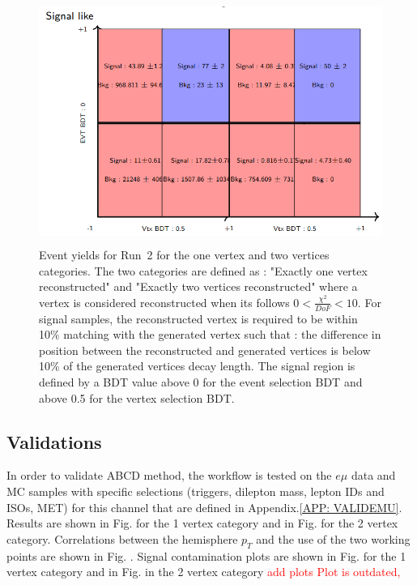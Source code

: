 \documentclass{cernatlasnote}
\begin{document}
        \begin{figure}[ht]
\centering
\includegraphics[height=8cm, width=12cm, trim= 0cm 0cm 0cm 0cm,clip]{images/ABCD/EVTYieldsRun2.png}
\caption{\label{fig:EVTYIELDS} Event yields for Run~2 for the one vertex and two vertices categories. The two categories are defined as : "Exactly one vertex reconstructed" and "Exactly two vertices reconstructed" where a vertex is considered reconstructed when its follows $0<\frac{\chi^2}{DoF}<10$. For signal samples, the reconstructed vertex is required to be within 10\% matching with the generated vertex such that : the difference in position between the reconstructed and generated vertices is below 10\% of the generated vertices decay length. The signal region is defined by a BDT value above 0 for the event selection BDT and above 0.5 for the vertex selection BDT. }
\end{figure}  
\FloatBarrier
        \subsection{Validations}
        In order to validate ABCD method, the workflow is tested on the $e\mu$ data and MC samples with specific selections (triggers, dilepton mass, lepton IDs and ISOs, MET) for this channel that are defined in Appendix.\ref{APP: VALIDEMU}. Results are shown in Fig. for the 1 vertex category and in Fig. for the 2 vertex category.
        Correlations between the hemisphere $p_T$ and the use of the two working points are shown in Fig. .
        Signal contamination plots are shown in Fig. for the 1 vertex category and in Fig. in the 2 vertex category \textcolor{red}{add plots}
        \textcolor{red}{Plot is outdated,}
   
    \newpage
\end{document}
